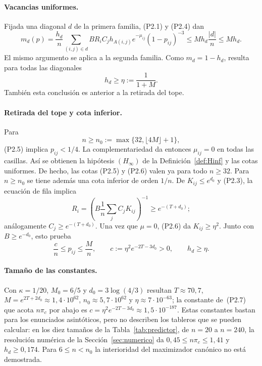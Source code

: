 \paragraph{Vacancias uniformes.}
Fijada una diagonal $d$ de la primera familia, (P2.1) y (P2.4) dan
\[
 m_d(p)=\frac{h_d}{n}\sum_{(i,j)\in d}
 B R_i C_j h_{A(i,j)}e^{-\mu_{ij}}(1-p_{ij})^{-3}
 \le M h_d\frac{|d|}{n}\le M h_d.
\]
El mismo argumento se aplica a la segunda familia.
Como $m_d=1-h_d$, resulta para todas las diagonales
\[
                 h_d\ge\eta:=\frac1{1+M}.        \tag{P2.6}
\]
También esta conclusión es anterior a la retirada del tope.

\paragraph{Retirada del tope y cota inferior.}
Para
\[
 n\ge n_0:=\max\{32,\lfloor4M\rfloor+1\},
\]
(P2.5) implica $p_{ij}<1/4$. La complementariedad da entonces
$\mu_{ij}=0$ en todas las casillas.
Así se obtienen la hipótesis $(H_\infty)$ de la Definición~\ref{def:Hinf} y
las cotas uniformes. De hecho, las cotas (P2.5) y
(P2.6) valen ya para todo $n\ge32$.
Para $n\ge n_0$ se tiene además una cota inferior de orden $1/n$.
De $K_{ij}\le e^{d_0}$ y (P2.3), la ecuación de fila implica
\[
 R_i=\left(B\frac1n\sum_jC_jK_{ij}\right)^{-1}
       \ge e^{-(T+d_0)};
\]
análogamente $C_j\ge e^{-(T+d_0)}$.
Una vez que $\mu=0$, (P2.6) da $K_{ij}\ge\eta^2$. Junto con
$B\ge e^{-d_0}$, esto prueba
\[
 \frac{c}{n}\le p_{ij}\le\frac Mn,\qquad
 c:=\eta^2e^{-2T-3d_0}>0,
 \qquad h_d\ge\eta.                              \tag{P2.7}
\]

\paragraph{Tamaño de las constantes.}
Con $\kappa=1/20$, $M_0=6/5$ y $d_0=3\log(4/3)$ resultan $T\approx70{,}7$,
$M=e^{2T+2d_0}\approx1{,}4\cdot10^{62}$, $n_0\approx5{,}7\cdot10^{62}$ y
$\eta\approx7\cdot10^{-63}$; la constante de~(P2.7) que acota $n\pi_c$ por abajo es
$c=\eta^2e^{-2T-3d_0}\approx1{,}5\cdot10^{-187}$. Estas constantes bastan para los enunciados asintóticos,
pero no
describen los tableros que se pueden calcular: en los diez tamaños de la Tabla~\ref{tab:predictor},
de $n=20$ a $n=240$, la resolución numérica de la Sección~\ref{sec:numerico} da
$0{,}45\le n\pi_c\le1{,}41$ y $h_d\ge0{,}174$. Para $6\le n<n_0$ la interioridad del maximizador
canónico no está demostrada.
